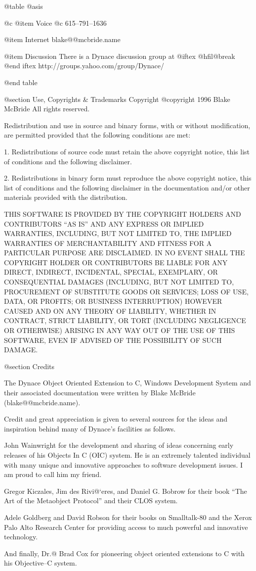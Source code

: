 @table @asis

@c @item Voice
@c 615--791--1636

@item Internet
blake@@mcbride.name

@item Discussion
There is a Dynace discussion group at 
@iftex
@hfil@break
@end iftex
http://groups.yahoo.com/group/Dynace/

@end table




@section Use, Copyrights & Trademarks
Copyright  @copyright{} 1996 Blake McBride
All rights reserved.

Redistribution and use in source and binary forms, with or without
modification, are permitted provided that the following conditions are
met:

1. Redistributions of source code must retain the above copyright
notice, this list of conditions and the following disclaimer.

2. Redistributions in binary form must reproduce the above copyright
notice, this list of conditions and the following disclaimer in the
documentation and/or other materials provided with the distribution.

THIS SOFTWARE IS PROVIDED BY THE COPYRIGHT HOLDERS AND CONTRIBUTORS
``AS IS'' AND ANY EXPRESS OR IMPLIED WARRANTIES, INCLUDING, BUT NOT
LIMITED TO, THE IMPLIED WARRANTIES OF MERCHANTABILITY AND FITNESS FOR
A PARTICULAR PURPOSE ARE DISCLAIMED. IN NO EVENT SHALL THE COPYRIGHT
HOLDER OR CONTRIBUTORS BE LIABLE FOR ANY DIRECT, INDIRECT, INCIDENTAL,
SPECIAL, EXEMPLARY, OR CONSEQUENTIAL DAMAGES (INCLUDING, BUT NOT
LIMITED TO, PROCUREMENT OF SUBSTITUTE GOODS OR SERVICES; LOSS OF USE,
DATA, OR PROFITS; OR BUSINESS INTERRUPTION) HOWEVER CAUSED AND ON ANY
THEORY OF LIABILITY, WHETHER IN CONTRACT, STRICT LIABILITY, OR TORT
(INCLUDING NEGLIGENCE OR OTHERWISE) ARISING IN ANY WAY OUT OF THE USE
OF THIS SOFTWARE, EVEN IF ADVISED OF THE POSSIBILITY OF SUCH DAMAGE.

@section Credits


The Dynace Object Oriented Extension to C, Windows Development System
and their associated documentation were written by Blake McBride
(blake@@mcbride.name).

Credit and great appreciation is given to several sources for the
ideas and inspiration behind many of Dynace's facilities as follows.

John Wainwright for the development and sharing of ideas concerning
early releases of his Objects In C (OIC) system.  He is an extremely
talented individual with many unique and innovative approaches to
software development issues.  I am proud to call him my friend.

Gregor Kiczales, Jim des Rivi@`eres, and Daniel G. Bobrow for their
book ``The Art of the Metaobject Protocol'' and their CLOS
system.

Adele Goldberg and David Robson for their books on Smalltalk-80 and
the Xerox Palo Alto Research Center for providing access to much
powerful and innovative technology.

And finally, Dr.@ Brad Cox for pioneering object oriented extensions
to C with his Objective--C system.


